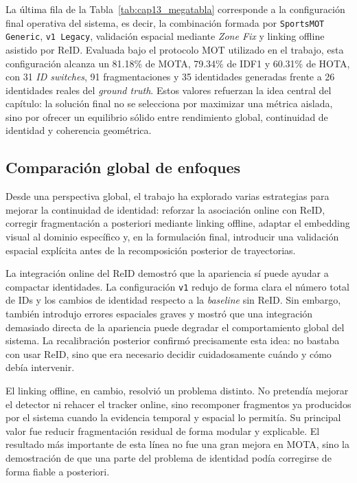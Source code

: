 \documentclass[../MAIN.tex]{subfiles}
\begin{document}
	La última fila de la Tabla~\ref{tab:cap13_megatabla} corresponde a la configuración final operativa del sistema, es decir, la combinación formada por \texttt{SportsMOT Generic}, \texttt{v1 Legacy}, validación espacial mediante \textit{Zone Fix} y linking offline asistido por ReID. Evaluada bajo el protocolo MOT utilizado en el trabajo, esta configuración alcanza un 81.18\% de MOTA, 79.34\% de IDF1 y 60.31\% de HOTA, con 31 \textit{ID switches}, 91 fragmentaciones y 35 identidades generadas frente a 26 identidades reales del \textit{ground truth}. Estos valores refuerzan la idea central del capítulo: la solución final no se selecciona por maximizar una métrica aislada, sino por ofrecer un equilibrio sólido entre rendimiento global, continuidad de identidad y coherencia geométrica.
	
	\subsection{Comparación global de enfoques}
	
	Desde una perspectiva global, el trabajo ha explorado varias estrategias para mejorar la continuidad de identidad: reforzar la asociación online con ReID, corregir fragmentación a posteriori mediante linking offline, adaptar el embedding visual al dominio específico y, en la formulación final, introducir una validación espacial explícita antes de la recomposición posterior de trayectorias.
	
	La integración online del ReID demostró que la apariencia sí puede ayudar a compactar identidades. La configuración \texttt{v1} redujo de forma clara el número total de IDs y los cambios de identidad respecto a la \textit{baseline} sin ReID. Sin embargo, también introdujo errores espaciales graves y mostró que una integración demasiado directa de la apariencia puede degradar el comportamiento global del sistema. La recalibración posterior confirmó precisamente esta idea: no bastaba con usar ReID, sino que era necesario decidir cuidadosamente cuándo y cómo debía intervenir.
	
	El linking offline, en cambio, resolvió un problema distinto. No pretendía mejorar el detector ni rehacer el tracker online, sino recomponer fragmentos ya producidos por el sistema cuando la evidencia temporal y espacial lo permitía. Su principal valor fue reducir fragmentación residual de forma modular y explicable. El resultado más importante de esta línea no fue una gran mejora en MOTA, sino la demostración de que una parte del problema de identidad podía corregirse de forma fiable a posteriori.
	
\end{document}
